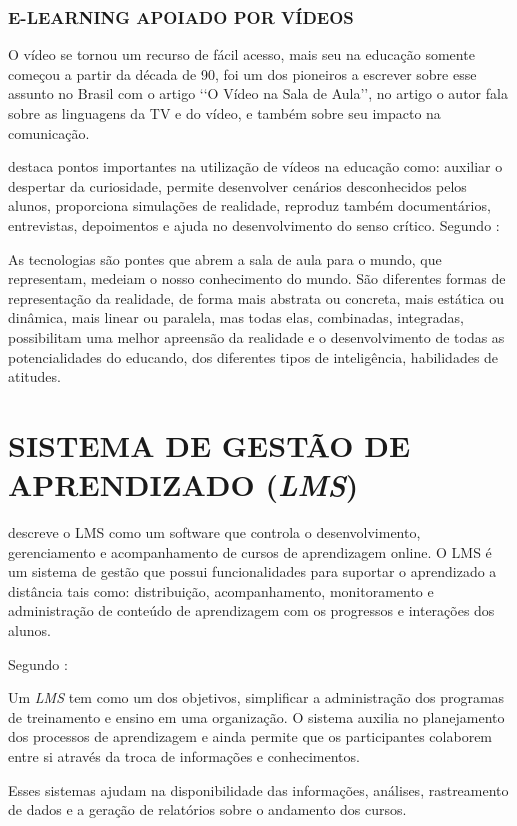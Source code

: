 \subsubsection{E-LEARNING APOIADO POR VÍDEOS}
O vídeo se tornou um recurso de fácil acesso, mais seu na educação somente começou a partir da década de 90,  foi um dos pioneiros a escrever sobre esse assunto no Brasil com o artigo \lq\lq O Vídeo na Sala de Aula\rq\rq, no artigo o autor fala sobre as linguagens da TV e do vídeo, e também sobre seu impacto na comunicação.
\par
{} destaca pontos importantes na utilização de vídeos na educação como: auxiliar o despertar da curiosidade, permite desenvolver cenários desconhecidos pelos alunos, proporciona simulações de realidade, reproduz também documentários, entrevistas, depoimentos e ajuda no desenvolvimento do senso crítico. Segundo :
\begin{citacao}
  As tecnologias são pontes que abrem a sala de aula para o mundo, que representam, medeiam o nosso conhecimento do mundo. São diferentes formas de representação da realidade, de forma mais abstrata ou concreta, mais estática ou dinâmica, mais linear ou paralela, mas todas elas, combinadas, integradas, possibilitam uma melhor apreensão da realidade e o desenvolvimento de todas as potencialidades do educando, dos diferentes tipos de inteligência, habilidades de atitudes.
\end{citacao}

\section{SISTEMA DE GESTÃO DE APRENDIZADO (\textit{LMS})}

 descreve o \ac{LMS} como um software que controla o desenvolvimento, gerenciamento e acompanhamento de cursos de aprendizagem online. O \ac{LMS} é um sistema de gestão que possui funcionalidades para suportar o aprendizado a distância tais como: distribuição, acompanhamento, monitoramento e administração de conteúdo de aprendizagem com os progressos e interações dos alunos.
\par
Segundo :
\begin{citacao}
  Um \textit{LMS} tem como um dos objetivos, simplificar a administração dos programas de treinamento e ensino em uma organização. O sistema auxilia no planejamento dos processos de aprendizagem e ainda permite que os participantes colaborem entre si através da troca de informações e conhecimentos.
\end{citacao}
\par
Esses sistemas ajudam na disponibilidade das informações, análises, rastreamento de dados e a geração de relatórios sobre o andamento dos cursos.

